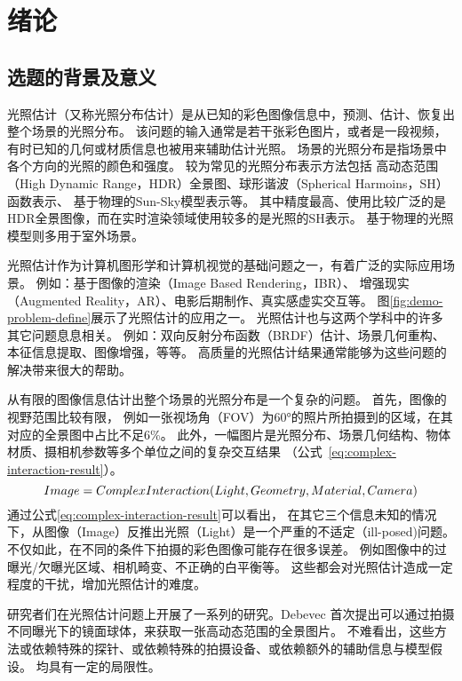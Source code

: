 \chapter{绪论}\label{chap:introduction}

\section{选题的背景及意义}

光照估计（又称光照分布估计）是从已知的彩色图像信息中，预测、估计、恢复出整个场景的光照分布。
该问题的输入通常是若干张彩色图片，或者是一段视频，有时已知的几何或材质信息也被用来辅助估计光照。
场景的光照分布是指场景中各个方向的光照的颜色和强度。
较为常见的光照分布表示方法包括
高动态范围（High Dynamic Range，HDR）全景图、球形谐波（Spherical Harmoins，SH）函数表示、
基于物理的Sun-Sky模型表示等。
其中精度最高、使用比较广泛的是HDR全景图像，而在实时渲染领域使用较多的是光照的SH表示。 
基于物理的光照模型则多用于室外场景。

光照估计作为计算机图形学和计算机视觉的基础问题之一，有着广泛的实际应用场景。
例如：基于图像的渲染（Image Based Rendering，IBR）、
增强现实（Augmented Reality，AR）、电影后期制作、真实感虚实交互等。
图\ref{fig:demo-problem-define}展示了光照估计的应用之一。
光照估计也与这两个学科中的许多其它问题息息相关。
例如：双向反射分布函数（BRDF）估计、场景几何重构、本征信息提取、图像增强，等等。
高质量的光照估计结果通常能够为这些问题的解决带来很大的帮助。
 

从有限的图像信息估计出整个场景的光照分布是一个复杂的问题。
首先，图像的视野范围比较有限，
例如一张视场角（FOV）为60°的照片所拍摄到的区域，在其对应的全景图中占比不足6\%。
此外，一幅图片是光照分布、场景几何结构、物体材质、摄相机参数等多个单位之间的复杂交互结果
（公式~\ref{eq:complex-interaction-result}）。
\begin{equation} \centering \label{eq:complex-interaction-result}
Image = ComplexInteraction(Light, Geometry, Material, Camera)\end{equation}
通过公式\ref{eq:complex-interaction-result}可以看出，
在其它三个信息未知的情况下，从图像（Image）反推出光照（Light）是一个严重的不适定（ill-posed)问题。
不仅如此，在不同的条件下拍摄的彩色图像可能存在很多误差。
例如图像中的过曝光/欠曝光区域、相机畸变、不正确的白平衡等。
这些都会对光照估计造成一定程度的干扰，增加光照估计的难度。

研究者们在光照估计问题上开展了一系列的研究。Debevec\cite{debevec1998rendering}
首次提出可以通过拍摄不同曝光下的镜面球体，来获取一张高动态范围的全景图片。
不难看出，这些方法或依赖特殊的探针、或依赖特殊的拍摄设备、或依赖额外的辅助信息与模型假设。
均具有一定的局限性。

